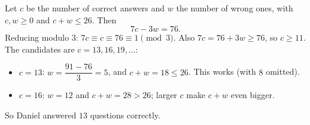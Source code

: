 Let $c$ be the number of correct answers and $w$ the number of wrong ones, with $c,w\ge0$ and $c+w\le26$. Then
\[
7c-3w=76 .
\]
Reducing modulo $3$: $7c\equiv c\equiv76\equiv1\pmod3$. Also $7c=76+3w\ge76$, so $c\ge11$. The candidates are $c=13,16,19,\dots$:
\begin{itemize}
\item $c=13$: $w=\dfrac{91-76}{3}=5$, and $c+w=18\le26$. This works (with $8$ omitted).
\item $c=16$: $w=12$ and $c+w=28>26$; larger $c$ make $c+w$ even bigger.
\end{itemize}
So Daniel answered $\boxed{13}$ questions correctly.
